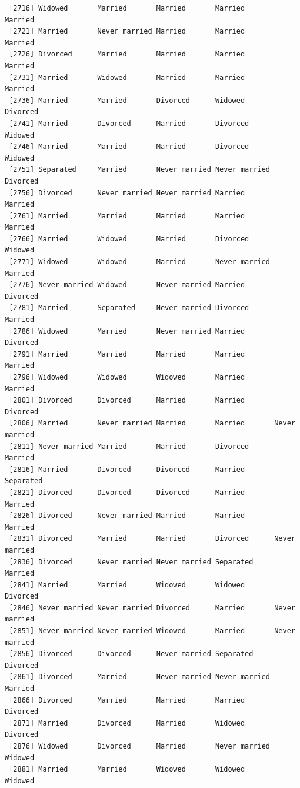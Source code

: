 \documentclass[
  letterpaper,
  DIV=11,
  numbers=noendperiod,
  oneside]{scrartcl}
\begin{document}
\begin{verbatim}
 [2716] Widowed       Married       Married       Married       Married      
 [2721] Married       Never married Married       Married       Married      
 [2726] Divorced      Married       Married       Married       Married      
 [2731] Married       Widowed       Married       Married       Married      
 [2736] Married       Married       Divorced      Widowed       Divorced     
 [2741] Married       Divorced      Married       Divorced      Widowed      
 [2746] Married       Married       Married       Divorced      Widowed      
 [2751] Separated     Married       Never married Never married Divorced     
 [2756] Divorced      Never married Never married Married       Married      
 [2761] Married       Married       Married       Married       Married      
 [2766] Married       Widowed       Married       Divorced      Widowed      
 [2771] Widowed       Widowed       Married       Never married Married      
 [2776] Never married Widowed       Never married Married       Divorced     
 [2781] Married       Separated     Never married Divorced      Married      
 [2786] Widowed       Married       Never married Married       Divorced     
 [2791] Married       Married       Married       Married       Married      
 [2796] Widowed       Widowed       Widowed       Married       Married      
 [2801] Divorced      Divorced      Married       Married       Divorced     
 [2806] Married       Never married Married       Married       Never married
 [2811] Never married Married       Married       Divorced      Married      
 [2816] Married       Divorced      Divorced      Married       Separated    
 [2821] Divorced      Divorced      Divorced      Married       Married      
 [2826] Divorced      Never married Married       Married       Married      
 [2831] Divorced      Married       Married       Divorced      Never married
 [2836] Divorced      Never married Never married Separated     Married      
 [2841] Married       Married       Widowed       Widowed       Divorced     
 [2846] Never married Never married Divorced      Married       Never married
 [2851] Never married Never married Widowed       Married       Never married
 [2856] Divorced      Divorced      Never married Separated     Divorced     
 [2861] Divorced      Married       Never married Never married Married      
 [2866] Divorced      Married       Married       Married       Divorced     
 [2871] Married       Divorced      Married       Widowed       Divorced     
 [2876] Widowed       Divorced      Married       Never married Widowed      
 [2881] Married       Married       Widowed       Widowed       Widowed      

\end{verbatim}
\end{document}
